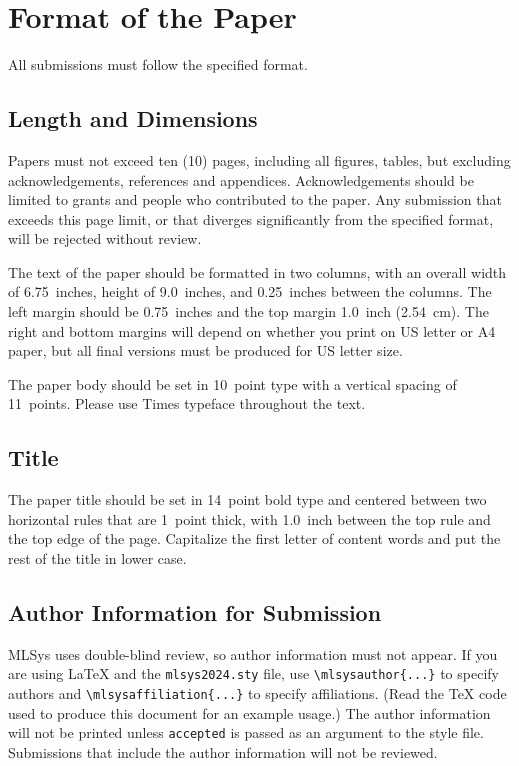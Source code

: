 \documentclass{article}
\begin{document}
\section{Format of the Paper}

All submissions must follow the specified format.

\subsection{Length and Dimensions}

Papers must not exceed ten (10) pages, including all figures, tables,
but excluding acknowledgements, references and appendices.
Acknowledgements should be limited to grants and people who contributed to the paper.
Any submission that exceeds
this page limit, or that diverges significantly from the specified format,
will be rejected without review.

The text of the paper should be formatted in two columns, with an
overall width of 6.75~inches, height of 9.0~inches, and 0.25~inches
between the columns. The left margin should be 0.75~inches and the top
margin 1.0~inch (2.54~cm). The right and bottom margins will depend on
whether you print on US letter or A4 paper, but all final versions
must be produced for US letter size.

The paper body should be set in 10~point type with a vertical spacing
of 11~points. Please use Times typeface throughout the text.

\subsection{Title}

The paper title should be set in 14~point bold type and centered
between two horizontal rules that are 1~point thick, with 1.0~inch
between the top rule and the top edge of the page. Capitalize the
first letter of content words and put the rest of the title in lower
case.

\subsection{Author Information for Submission}
\label{author info}

MLSys uses double-blind review, so author information must not appear. If
you are using \LaTeX\/ and the \texttt{mlsys2024.sty} file, use
\verb+\mlsysauthor{...}+ to specify authors and \verb+\mlsysaffiliation{...}+ to specify affiliations. (Read the TeX code used to produce this document for an example usage.) The author information
will not be printed unless \texttt{accepted} is passed as an argument to the
style file.
Submissions that include the author information will not
be reviewed.
\end{document}
